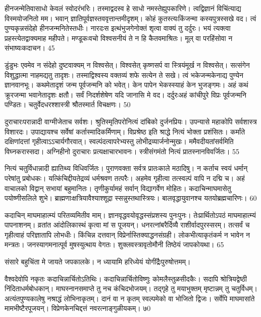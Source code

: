 हीनजन्मेतिवासाधो केवलं स्वोदरंभरिः।
तस्माद्वदस्व हे साधो नमस्तेह्युपकारिणे।
त्वद्विज्ञानं विचिंत्याद्य विस्मयोजनितो मम।
भवान् ज्ञातिपूर्वज्ञस्तववृत्तान्तमीदृशम्।
कोहं कुतस्त्यःकिंजन्मा कस्यपुत्रस्सखे वद।
त्वं पुण्यकृन्नसंदेहो हीनजन्मनितेस्तधीः।
नारदःस इत्थंभुजगेनोक्तं शृत्वा वाक्यं तु दर्दुरः।
भयं त्यक्त्वा प्रहस्त्येतद्वाक्यमाह महीपते।
मण्डूकःवचो विश्वसनीयं ते न हि कैतवमाश्रितः।
मूल् वा परहिंसोवा न संभाष्यःकदाचन।
45

डुंडुभः
एवमेव न संदेहो दुष्टवाक्यम् न विश्वसेत्।
विश्वसेत् कृष्णसर्प वा स्त्रियंमूर्ख न विश्वसेत्।
सत्संगेन विशुद्धात्मा नाहमद्यतु तादृशः।
तस्माद्विश्वस्य वक्तव्यं शफे सत्येन ते सखे।
त्वं भकेजन्मकेनाद्य पुण्येन ज्ञानवानभूः।
कथमेतादृशं जन्म पूर्वजन्मनि को भवेत्।
केन पापेन भेकस्स्याहं केन भुजङ्गमः।
अहं कथं क्रूरजन्मा भवानेतादृशः क्षतौ।
सर्वं निदर्शशेषेण यदि जानासि मे वद।
दर्दुरःअहं कांचीपुरे विप्रः पूर्वजन्मनि पण्डितः।
चतुर्वेदधरश्शास्त्री श्रौतस्मार्त विचक्षणः।
50

दुराचारःपरान्नादी वाग्मीजेताच सर्वशः।
श्रुतिस्मृतिपरोनित्यं दांबिको दुर्जनप्रियः।
उपन्यासे महाकोपि सर्वशास्त्र विशारदः।
उपाद्यायश्च सर्वेषां कर्तास्मादिकर्मिणाम्।
विप्रश्रेष्ठ इति श्राद्धे नित्यं भोक्ता प्रशंसितः।
कर्मांते दक्षिणांदत्तां गृहीत्वाऽऽचार्यगौरवात्।
स्वल्पंदत्वापरेभ्यस्तु लोभीद्रव्यार्जनोन्मुखः।
ममैवदीयतांसर्वमिति विघ्नकरास्सदा।
अग्निहीनो दुराचारः प्रत्यक्षाचारभावनः।
स्त्रीसंगमंतो नित्यं प्रातस्नानविवर्जितः।
55


नित्यं चतुर्विधान्नादी ह्यातिथ्य विधिवर्जितः।
पुराणवक्ता सर्वत्र प्रातःकाले मठादिषु।
न कर्ताच स्वयं धर्मान् परेषांतु प्रबोधकः।
यत्किंचिद्दीयतेद्रव्यं धर्मश्रवण तत्परैः।
अहमेव गृहीत्वा तत्स्वल्पं वापि न दद्मि च।
अहं वाचालको विद्वान् सभायां बहुमानितः।
तृणीकुर्यामहं सर्वान् विद्यागर्वेण मोहितः।
कदाचिन्माघमासेतु पयोष्णीसलिले शुभे।
ब्राह्मणाःक्षत्रियावैश्याश्शूद्रा स्सन्नुस्तथास्त्रियः।
बालवृद्धायुवानश्च यतयोब्रह्मचारिणः।
60

कदाचिन् माघमाहात्म्यं परितव्यमितीव माम्।
ज्ञानवृद्धवयोवृद्धस्संप्रशस्य पुनःपुनः।
तेःप्रार्थितोऽपठं माघमाहात्म्यं पापनाशनम्।
व्रतांत आंदोलिकास्थं कृत्वा मां स पूजयन्।
धनरत्नांबरैर्दिव्यै राशीर्वादपुरस्सरम्।
तत्सर्वं च गृहीत्वाहं परिज्ञातापि लोभधीः।
किंचिन्न दत्तवान् विप्रेर्नास्तिक्याद्धनसंग्रही।
लोकभीत्याकृतंकर्म न भावेन न मन्त्रतः।
जनस्यागमनात्पूर्व मुषस्युत्थाय वेगतः।
शुक्लवस्त्रावृतोमौनी तिष्ठेयं जापकोयथा।
65

संसारे बहुचिंता मे जायते जपकालके।
न ध्यायामि हरिध्येयं योगींद्रैःपुरुषोत्तमम्।

वैश्वदेवोपि नकृतः कदाचिन्नार्चितोऽतिथिः।
कदाचिन्नार्चितोविष्णुः कोमलैस्तुळसीदकैः।
सदापि श्रोत्रियद्वेष्ठी निंदिताधर्मबोधकान्।
माघस्नानसमाप्ते तु नच कंचिदभोजयम्।
तद्गृहे तु मयाभुक्तम् मृष्टान्नम् तु चतुर्विधम्।
अत्यंतपुण्यकालेषु नश्राद्धं लोभिनाकृतम्।
दानं वा न कृतम् स्वल्पमेको वा भोजितो द्विजः।
सर्वेपि माघमासांते मामभीष्टैरपूजयन्।
विप्रेणकेनचिद्दत्तं नवरत्नाङ्गुळीयकम्।
७0

